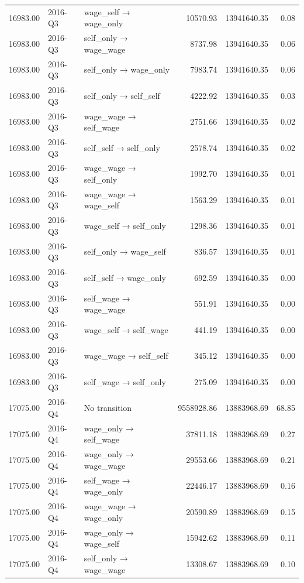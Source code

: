 \begin{table}[ht]
{\begin{tabular}{rllrrr}
  16983.00 & 2016-Q3 & wage\_self → wage\_only & 10570.93 & 13941640.35 & 0.08 \\ 
  16983.00 & 2016-Q3 & self\_only → wage\_wage & 8737.98 & 13941640.35 & 0.06 \\ 
  16983.00 & 2016-Q3 & self\_only → wage\_only & 7983.74 & 13941640.35 & 0.06 \\ 
  16983.00 & 2016-Q3 & self\_only → self\_self & 4222.92 & 13941640.35 & 0.03 \\ 
  16983.00 & 2016-Q3 & wage\_wage → self\_wage & 2751.66 & 13941640.35 & 0.02 \\ 
  16983.00 & 2016-Q3 & self\_self → self\_only & 2578.74 & 13941640.35 & 0.02 \\ 
  16983.00 & 2016-Q3 & wage\_wage → self\_only & 1992.70 & 13941640.35 & 0.01 \\ 
  16983.00 & 2016-Q3 & wage\_wage → wage\_self & 1563.29 & 13941640.35 & 0.01 \\ 
  16983.00 & 2016-Q3 & wage\_self → self\_only & 1298.36 & 13941640.35 & 0.01 \\ 
  16983.00 & 2016-Q3 & self\_only → wage\_self & 836.57 & 13941640.35 & 0.01 \\ 
  16983.00 & 2016-Q3 & self\_self → wage\_only & 692.59 & 13941640.35 & 0.00 \\ 
  16983.00 & 2016-Q3 & self\_wage → wage\_wage & 551.91 & 13941640.35 & 0.00 \\ 
  16983.00 & 2016-Q3 & wage\_self → self\_wage & 441.19 & 13941640.35 & 0.00 \\ 
  16983.00 & 2016-Q3 & wage\_wage → self\_self & 345.12 & 13941640.35 & 0.00 \\ 
  16983.00 & 2016-Q3 & self\_wage → self\_only & 275.09 & 13941640.35 & 0.00 \\ 
  17075.00 & 2016-Q4 & No transition & 9558928.86 & 13883968.69 & 68.85 \\ 
  17075.00 & 2016-Q4 & wage\_only → self\_wage & 37811.18 & 13883968.69 & 0.27 \\ 
  17075.00 & 2016-Q4 & wage\_only → wage\_wage & 29553.66 & 13883968.69 & 0.21 \\ 
  17075.00 & 2016-Q4 & self\_wage → wage\_only & 22446.17 & 13883968.69 & 0.16 \\ 
  17075.00 & 2016-Q4 & wage\_wage → wage\_only & 20590.89 & 13883968.69 & 0.15 \\ 
  17075.00 & 2016-Q4 & wage\_only → wage\_self & 15942.62 & 13883968.69 & 0.11 \\ 
  17075.00 & 2016-Q4 & self\_only → wage\_wage & 13308.67 & 13883968.69 & 0.10 \\ 

\end{tabular}}
\end{table}
